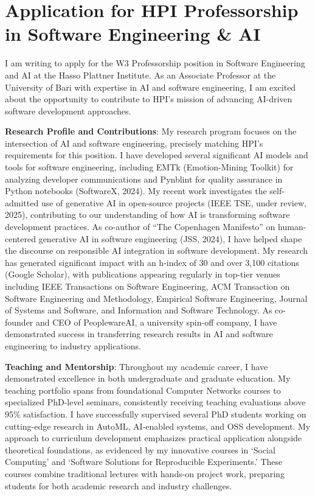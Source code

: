 \section{Application for HPI Professorship in Software Engineering \& AI}

I am writing to apply for the W3 Professorship position in Software Engineering and AI at the Hasso Plattner Institute.
As an Associate Professor at the University of Bari with expertise in AI and software engineering, I am excited about 
the opportunity to contribute to HPI's mission of advancing AI-driven software development approaches.

\textbf{Research Profile and Contributions}:
My research program focuses on the intersection of AI and software engineering, precisely matching HPI's requirements for this position. 
I have developed several significant AI models and tools for software engineering, including EMTk (Emotion-Mining Toolkit) for analyzing developer communications and Pynblint for quality assurance in Python notebooks (SoftwareX, 2024).
My recent work investigates the self-admitted use of generative AI in open-source projects (IEEE TSE, under review, 2025), contributing to our understanding of how AI is transforming software development practices. 
As co-author of ``The Copenhagen Manifesto'' on human-centered generative AI in software engineering (JSS, 2024), I have helped shape the discourse on responsible AI integration in software development. 
My research has generated significant impact with an h-index of 30 and over 3,100 citations (Google Scholar), with publications appearing regularly in top-tier venues including IEEE Transactions on Software Engineering, ACM Transaction on Software Engineering and Methodology, Empirical Software Engineering, Journal of Systems and Software, and Information and Software Technology.
As co-founder and CEO of PeoplewareAI, a university spin-off company, I have demonstrated success in transferring research results in AI and software engineering to industry applications. 

\textbf{Teaching and Mentorship}:
Throughout my academic career, I have demonstrated excellence in both undergraduate and graduate education. 
My teaching portfolio spans from foundational Computer Networks courses to specialized PhD-level seminars, consistently receiving teaching evaluations above 95\% satisfaction. 
I have successfully supervised several PhD students working on cutting-edge research in AutoML, AI-enabled systems, and OSS development. 
My approach to curriculum development emphasizes practical application alongside theoretical foundations, as evidenced by my innovative courses in `Social Computing' and `Software Solutions for Reproducible Experiments.'
These courses combine traditional lectures with hands-on project work, preparing students for both academic research and industry challenges.

